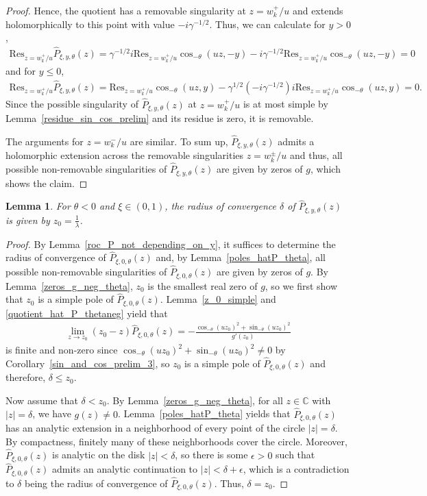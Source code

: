 \documentclass[10pt,a4paper]{amsart}
\newcommand{\C}{\mathbb{C}} %
\newcommand{\1}{\mathds{1}}
\newtheorem{Lemma}[definition]{Lemma}
\begin{document}
\begin{proof}
Hence, the quotient has a removable singularity at $z= w_k^+/u$ and extends holomorphically to this point with value $-i\gamma^{-1/2}$. Thus, we can calculate for $y>0$,
\begin{align*}
   \mathrm{Res}_{z=w_k^+/u}\hat{P}_{\xi,y,\theta}(z)=\gamma^{-1/2}i\mathrm{Res}_{z=w_k^+/u}\cos_{-\theta}(uz,-y)-i\gamma^{-1/2}\mathrm{Res}_{z=w_k^+/u}\cos_{-\theta}(uz,-y)=0
\end{align*}
and for $y\le 0$,
\begin{align*}
   \mathrm{Res}_{z=w_k^+/u}\hat{P}_{\xi,y,\theta}(z)=\mathrm{Res}_{z=w_k^+/u}\cos_{-\theta}(uz,y)-\gamma^{1/2}(-i\gamma^{-1/2})i\mathrm{Res}_{z=w_k^+/u}\cos_{-\theta}(uz,y)=0.
\end{align*}
Since the possible singularity of $\hat{P}_{\xi,y,\theta}(z)$ at $z=w_k^+/u$ is at most simple by Lemma~\ref{residue_sin_cos_prelim} and its residue is zero, it is removable.

The arguments for $z=w_k^-/u$ are similar. To sum up, $\hat{P}_{\xi,y,\theta}(z)$ admits a holomorphic extension across the removable singularities $z=w_k^\pm/u$ and thus, all possible non-removable singularities of $\hat{P}_{\xi,y,\theta}(z)$ are given by zeros of $g$, which shows the claim.
\end{proof}
\begin{Lemma}\label{roc_hatP_theta_le-1}
     For $\theta<0$ and $\xi\in(0,1)$, the radius of convergence $\delta$ of $\hat{P}_{\xi,y,\theta}(z)$ is given by $z_0=\frac{1}{\lambda}$.
\end{Lemma}
\begin{proof}
    By Lemma~\ref{roc_P_not_depending_on_y}, it suffices to determine the radius of convergence of $\hat{P}_{\xi,0,\theta}(z)$ and, by Lemma~\ref{poles_hatP_theta}, all possible non-removable singularities of $\hat{P}_{\xi,0,\theta}(z)$ are given by zeros of $g$. 
   By Lemma~\ref{zeros_g_neg_theta}, $z_0$ is the smallest real zero of $g$, so we first show that $z_0$ is a simple pole of $\hat{P}_{\xi,0,\theta}(z)$.
 Lemma~\ref{z_0_simple} and \eqref{quotient_hat_P_thetaneg} yield that
\begin{align*}
    \lim_{z\to z_0}\left(z_0-z\right)\hat{P}_{\xi,0,\theta}(z)=-\frac{\cos_{-\theta}(uz_0)^2+\sin_{-\theta}(uz_0)^2}{g'(z_0)}
\end{align*}
 is finite and non-zero since $\cos_{-\theta}(uz_0)^2+\sin_{-\theta}(uz_0)^2\neq 0$ by Corollary~\ref{sin_and_cos_prelim_3}, so $z_0$ is a simple pole of $\hat{P}_{\xi,0,\theta}(z)$ and therefore, $\delta\leq z_0$. 

Now assume that $\delta <z_0$. 
By Lemma~\ref{zeros_g_neg_theta}, for all $z\in\C$ with $|z|=\delta$, we have $g(z)\neq 0$. Lemma~\ref{poles_hatP_theta} yields that $\hat{P}_{\xi,0,\theta}(z)$ has an analytic extension in a neighborhood of every point of the circle $|z|=\delta$. By compactness, finitely many of these neighborhoods cover the circle. Moreover, $\hat{P}_{\xi,0,\theta}(z)$ is analytic on the disk $|z|<\delta$, so there is some $\epsilon >0$ such that $\hat{P}_{\xi,0,\theta}(z)$ admits an analytic continuation to $|z|<\delta+\epsilon$, which is a contradiction to $\delta$ being the radius of convergence of $\hat{P}_{\xi,0,\theta}(z)$. Thus, $\delta=z_0$.
\end{proof}
\end{document}
